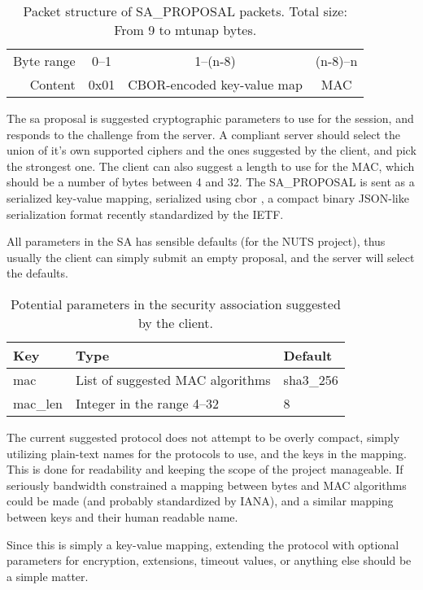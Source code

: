 \begin{table}[ht!]
\centering
    \begin{tabular}{r | c | c | c |}
    \cline{2-4}
    Byte range & 0--1 & 1--(n-8) & (n-8)--n \\ \cline{2-4}
    Content & 0x01 & CBOR-encoded key-value map & MAC \\ \cline{2-4}
    \end{tabular}
    \caption{Packet structure of SA\_PROPOSAL packets. Total size: From 9 to \gls{mtunap} bytes.}
\end{table}


The \gls{sa} proposal is suggested cryptographic parameters to use for the session, and responds to the challenge from the server. A compliant server should select the union of it's own supported ciphers and the ones suggested by the client, and pick the strongest one. The client can also suggest a length to use for the MAC, which should be a number of bytes between 4 and 32. The SA\_PROPOSAL is sent as a serialized key-value mapping, serialized using \gls{cbor} \cite{cbor}, a compact binary JSON-like serialization format recently standardized by the IETF.

All parameters in the SA has sensible defaults (for the NUTS project), thus usually the client can simply submit an empty proposal, and the server will select the defaults.

\begin{table}
\centering
    \begin{tabular}{| l | l | l |}
    \hline
    Key & Type & Default \\ \hline
    mac & List of suggested MAC algorithms & sha3\_256 \\ \hline
    mac\_len & Integer in the range 4--32 & 8 \\ \hline
    \end{tabular}
    \caption{Potential parameters in the security association suggested by the client.}\label{tab:sa}
\end{table}

The current suggested protocol does not attempt to be overly compact, simply utilizing plain-text names for the protocols to use, and the keys in the mapping. This is done for readability and keeping the scope of the project manageable. If seriously bandwidth constrained a mapping between bytes and MAC algorithms could be made (and probably standardized by IANA), and a similar mapping between keys and their human readable name.

Since this is simply a key-value mapping, extending the protocol with optional parameters for encryption, extensions, timeout values, or anything else should be a simple matter.

